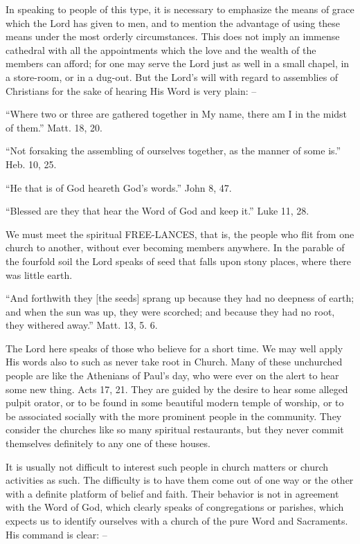 \documentclass[
]{book}
\begin{document}
In speaking to people of this type, it is necessary to emphasize the means of grace which the Lord has given to men, and to mention the advantage of using these means under the most orderly circumstances. This does not imply an immense cathedral with all the appointments which the love and the wealth of the members can afford; for one may serve the Lord just as well in a small chapel, in a store-room, or in a dug-out. But the Lord's will with regard to assemblies of Christians for the sake of hearing His Word is very plain: --

``Where two or three are gathered together in My name, there am I in the midst of them.'' Matt. 18, 20.

``Not forsaking the assembling of ourselves together, as the manner of some is.'' Heb. 10, 25.

``He that is of God heareth God's words.'' John 8, 47.

``Blessed are they that hear the Word of God and keep it.'' Luke 11, 28.

We must meet the spiritual FREE-LANCES, that is, the people who flit from one church to another, without ever becoming members anywhere. In the parable of the fourfold soil the Lord speaks of seed that falls upon stony places, where there was little earth.

``And forthwith they {[}the seeds{]} sprang up because they had no deepness of earth; and when the sun was up, they were scorched; and because they had no root, they withered away.'' Matt. 13, 5. 6.

The Lord here speaks of those who believe for a short time. We may well apply His words also to such as never take root in Church. Many of these unchurched people are like the Athenians of Paul's day, who were ever on the alert to hear some new thing. Acts 17, 21. They are guided by the desire to hear some alleged pulpit orator, or to be found in some beautiful modern temple of worship, or to be associated socially with the more prominent people in the community. They consider the churches like so many spiritual restaurants, but they never commit themselves definitely to any one of these houses.

It is usually not difficult to interest such people in church matters or church activities as such. The difficulty is to have them come out of one way or the other with a definite platform of belief and faith. Their behavior is not in agreement with the Word of God, which clearly speaks of congregations or parishes, which expects us to identify ourselves with a church of the pure Word and Sacraments. His command is clear: --
\end{document}
